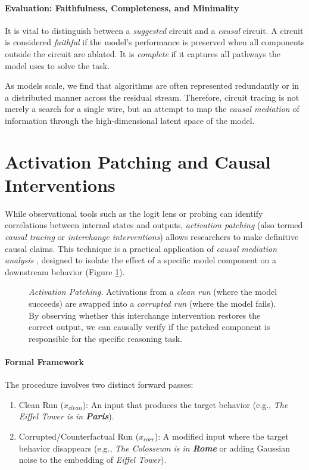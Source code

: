 \paragraph{Evaluation: Faithfulness, Completeness, and Minimality}
It is vital to distinguish between a \emph{suggested} circuit and a \emph{causal} circuit. A circuit is considered \emph{faithful} if the model's performance is preserved when all components outside the circuit are ablated. It is \emph{complete} if it captures all pathways the model uses to solve the task. 

As models scale, we find that algorithms are often represented redundantly or in a distributed manner across the residual stream. Therefore, circuit tracing is not merely a search for a single wire, but an attempt to map the \emph{causal mediation} of information through the high-dimensional latent space of the model.


\section{Activation Patching and Causal Interventions}

While observational tools such as the logit lens or probing can identify correlations between internal states and outputs, \emph{activation patching} (also termed \emph{causal tracing} or \emph{interchange interventions}) allows researchers to make definitive causal claims. This technique is a practical application of \emph{causal mediation analysis} \citep{vig2020investigating}, designed to isolate the effect of a specific model component on a downstream behavior (Figure \ref{fig:activation_patching}).

\begin{figure}[htbp]
    \centering
    \resizebox{0.65\textwidth}{!}{
        
    }
    \caption{\emph{Activation Patching.} Activations from a \emph{clean run} (where the model succeeds) are swapped into a \emph{corrupted run} (where the model fails). By observing whether this interchange intervention restores the correct output, we can causally verify if the patched component is responsible for the specific reasoning task.}
    \label{fig:activation_patching}
\end{figure}


\paragraph{Formal Framework}
The procedure involves two distinct forward passes:
\begin{enumerate}
    \item Clean Run ($x_{clean}$): An input that produces the target behavior (e.g., {\em The Eiffel Tower is in \textbf{Paris}}).
    \item Corrupted/Counterfactual Run ($x_{corr}$): A modified input where the target behavior disappears (e.g., {\em The Colosseum is in \textbf{Rome}} or adding Gaussian noise to the embedding of {\em Eiffel Tower}).
\end{enumerate}

